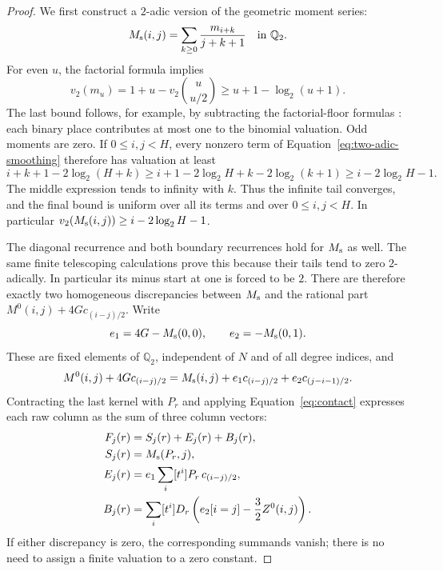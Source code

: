 \begin{proof}
We first construct a $2$-adic version of the geometric moment series:
\begin{equation}\label{eq:two-adic-smoothing}
M_{\rm s}(i,j)=\sum_{k\ge0}\frac{m_{i+k}}{j+k+1}\quad\text{in }\mathbb Q_2.
\end{equation}
For even $u$, the factorial formula implies
\[
v_2(m_u)=1+u-v_2\binom{u}{u/2}
\ge u+1-\log_2(u+1).
\]
The last bound follows, for example, by subtracting the factorial-floor
formulas \cite{Legendre1808}: each binary place contributes at most one to the binomial
valuation. Odd moments are zero. If $0\le i,j<H$, every nonzero term
of Equation~\eqref{eq:two-adic-smoothing} therefore has valuation at least
\begin{equation}\label{eq:smoothing-tail-bound}
i+k+1-2\log_2(H+k)
\ge i+1-2\log_2 H+k-2\log_2(k+1)
\ge i-2\log_2 H-1.
\end{equation}
The middle expression tends to infinity with $k$. Thus the infinite
tail converges, and the final bound is uniform over all its terms and
over $0\le i,j<H$. In particular
$v_2(M_{\rm s}(i,j))\ge i-2\log_2H-1$.

The diagonal recurrence and both boundary recurrences hold for
$M_{\rm s}$ as well. The same finite telescoping calculations prove
this because their tails tend to zero $2$-adically. In particular its
minus start at one is forced to be $2$. There are therefore exactly
two homogeneous discrepancies between $M_{\rm s}$ and the rational
part $M^0(i,j)+4G c_{(i-j)/2}$. Write
\begin{equation}\label{eq:two-adic-discrepancies}
e_1=4G-M_{\rm s}(0,0),\qquad e_2=-M_{\rm s}(0,1).
\end{equation}
These are fixed elements of $\mathbb Q_2$, independent of $N$ and of
all degree indices, and
\[
M^0(i,j)+4G c_{(i-j)/2}
=M_{\rm s}(i,j)+e_1c_{(i-j)/2}+e_2c_{(j-i-1)/2}.
\]
Contracting the last kernel with $P_r$ and applying
Equation~\eqref{eq:contact} expresses each raw column as the sum of
three column vectors:
\begin{equation}\label{eq:two-adic-column-types}
\begin{split}
F_j(r)&=S_j(r)+E_j(r)+B_j(r),\\
S_j(r)&=M_{\rm s}(P_r,j),\\
E_j(r)&=e_1\sum_i[t^i]P_r\,c_{(i-j)/2},\\
B_j(r)&=\sum_i[t^i]D_r\left(e_2[i=j]-\frac32Z^0(i,j)\right).
\end{split}
\end{equation}
If either discrepancy is zero, the corresponding summands vanish;
there is no need to assign a finite valuation to a zero constant.


\end{proof}
